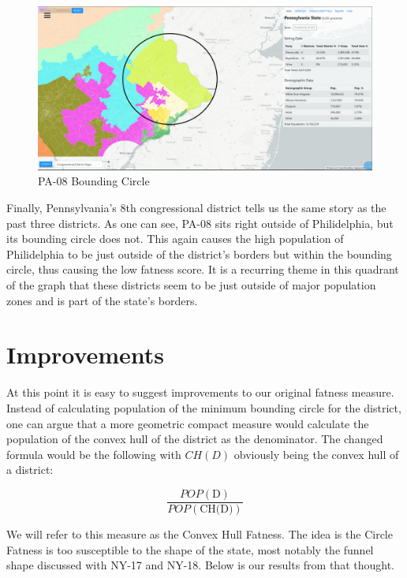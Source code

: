 \documentclass[letterpaper]{article}
\begin{document}
\begin{figure}[H]
	\includegraphics[width=\linewidth]{./figures/PA-08-BoundingCircle.png}
	\caption{PA-08 Bounding Circle}
	\label{fig:pa08boundingCircle}
\end{figure}

Finally, Pennsylvania's 8th congressional district tells us the same story as the past three districts. As one can see, PA-08 sits right outside of Philidelphia, but its bounding circle does not. This again causes the high population of Philidelphia to be just outside of the district's borders but within the bounding circle, thus causing the low fatness score. It is a recurring theme in this quadrant of the graph that these districts seem to be just outside of major population zones and is part of the state's borders.

\section{Improvements}
At this point it is easy to suggest improvements to our original fatness measure. Instead of calculating population of the minimum bounding circle for the district, one can argue that a more geometric compact measure would calculate the population of the convex hull of the district as the denominator. The changed formula would be the following with $CH(D)$ obviously being the convex hull of a district:

\[
	\frac{POP(\text{D})}{POP(\text{CH(D)})}
\]

We will refer to this measure as the Convex Hull Fatness. The idea is the Circle Fatness is too susceptible to the shape of the state, most notably the funnel shape discussed with NY-17 and NY-18. Below is our results from that thought.
\end{document}
